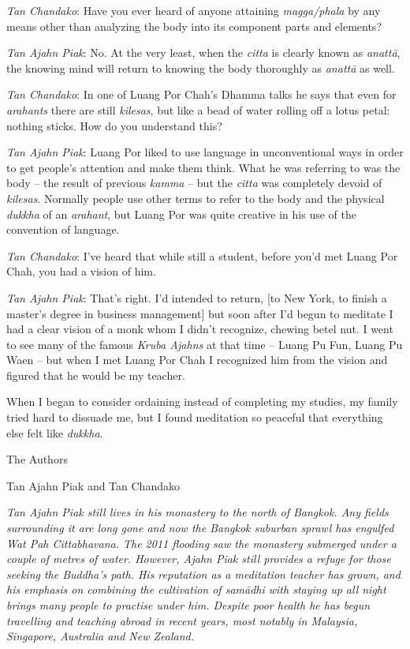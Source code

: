\emph{Tan Chandako}: Have you ever heard of anyone attaining
\emph{magga/phala} by any means other than analyzing the body into its
component parts and elements?

\emph{Tan Ajahn Piak}: No. At the very least, when the \emph{citta} is
clearly known as \emph{anattā}, the knowing mind will return to knowing
the body thoroughly as \emph{anattā} as well.

\emph{Tan Chandako}: In one of Luang Por Chah's Dhamma talks he says
that even for \emph{arahants} there are still \emph{kilesas}, but like a
bead of water rolling off a lotus petal: nothing sticks. How do you
understand this?

\emph{Tan Ajahn Piak}: Luang Por liked to use language in unconventional
ways in order to get people's attention and make them think. What he was
referring to was the body -- the result of previous \emph{kamma} --
but the \emph{citta} was completely devoid of \emph{kilesas}. Normally
people use other terms to refer to the body and the physical
\emph{dukkha} of an \emph{arahant}, but Luang Por was quite creative in
his use of the convention of language.

\emph{Tan Chandako}: I've heard that while still a student, before you'd
met Luang Por Chah, you had a vision of him.

\emph{Tan Ajahn Piak}: That's right. I'd intended to return, {[}to New
York, to finish a master's degree in business management{]} but soon
after I'd begun to meditate I had a clear vision of a monk whom I didn't
recognize, chewing betel nut. I went to see many of the famous
\emph{Kruba Ajahns  } at that time -- Luang Pu Fun, Luang Pu Waen --
but when I met Luang Por Chah I recognized him from the vision and
figured that he would be my teacher.

When I began to consider ordaining instead of completing my studies, my
family tried hard to dissuade me, but I found meditation so peaceful
that everything else felt like \emph{dukkha}.



The Authors

Tan Ajahn Piak and Tan Chandako

\emph{Tan Ajahn Piak still lives in his monastery to the north of
Bangkok. Any fields surrounding it are long gone and now the Bangkok
suburban sprawl has engulfed Wat Pah Cittabhavana. The 2011 flooding saw
the monastery submerged under a couple of metres of water. However,
Ajahn Piak still provides a refuge for those seeking the Buddha's path.
His reputation as a meditation teacher has grown, and his emphasis on
combining the cultivation of samādhi with staying up all night brings
many people to practise under him. Despite poor health he has begun
travelling and teaching abroad in recent years, most notably in
Malaysia, Singapore, Australia and New Zealand.}

